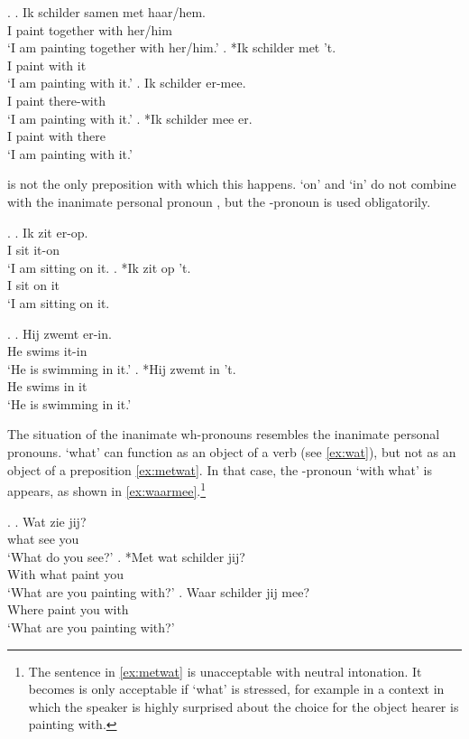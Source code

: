 \documentclass[12pt]{article}
\begin{document}
\ex. \label{ex:objprep}
\ag. Ik schilder samen met haar/hem.\\
 I paint together with her/him\\
 `I am painting together with her/him.'\label{ex:prepani}
\bg. *Ik schilder met 't.\\
 I paint with it\\
 `I am painting with it.'\label{ex:prephet}
\bg. Ik schilder er-mee.\\
 I paint there-with\\
 `I am painting with it.'\label{ex:preper}
\bg. *Ik schilder mee er.\\
 I paint with there\\
 `I am painting with it.'\label{ex:erprep}

 is not the only preposition with which this happens.  `on' and  `in' do not combine with the inanimate personal pronoun , but the -pronoun is used obligatorily.

\ex.
\ag. Ik zit er-op.\\
 I sit it-on\\
 `I am sitting on it.
\bg. *Ik zit op 't.\\
 I sit on it\\
 `I am sitting on it.

\ex.
 \ag. Hij zwemt er-in.\\
  He swims it-in\\
  `He is swimming in it.'
 \bg. *Hij zwemt in 't.\\
  He swims in it\\
  `He is swimming in it.'

The situation of the inanimate wh-pronouns resembles the inanimate personal pronouns.  `what' can function as an object of a verb (see \ref{ex:wat}), but not as an object of a preposition \ref{ex:metwat}. In that case, the -pronoun  `with what' is appears, as shown in \ref{ex:waarmee}.\footnote{The sentence in \ref{ex:metwat} is unacceptable with neutral intonation. It becomes is only acceptable if  `what' is stressed, for example in a context in which the speaker is highly surprised about the choice for the object hearer is painting with.}

\ex.
\ag. Wat zie jij?\\
 what see you\\
 `What do you see?'\label{ex:wat}
\bg. *Met wat schilder jij?\\
 With what paint you\\
 `What are you painting with?'\label{ex:metwat}
\bg. Waar schilder jij mee?\\
 Where paint you with\\
 `What are you painting with?'\label{ex:waarmee}
\end{document}
